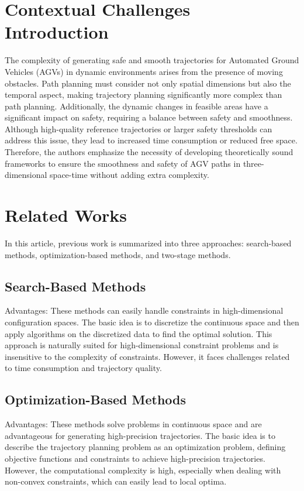 \section{Contextual Challenges Introduction}
The complexity of generating safe and smooth trajectories for Automated Ground Vehicles (AGVs) in dynamic environments arises from the presence of moving obstacles. Path planning must consider not only spatial dimensions but also the temporal aspect, making trajectory planning significantly more complex than path planning. Additionally, the dynamic changes in feasible areas have a significant impact on safety, requiring a balance between safety and smoothness. Although high-quality reference trajectories or larger safety thresholds can address this issue, they lead to increased time consumption or reduced free space. Therefore, the authors emphasize the necessity of developing theoretically sound frameworks to ensure the smoothness and safety of AGV paths in three-dimensional space-time without adding extra complexity.
\section{Related Works}
In this article, previous work is summarized into three approaches: search-based methods, optimization-based methods, and two-stage methods.
\subsection{Search-Based Methods}
Advantages: These methods can easily handle constraints in high-dimensional configuration spaces. The basic idea is to discretize the continuous space and then apply algorithms on the discretized data to find the optimal solution. This approach is naturally suited for high-dimensional constraint problems and is insensitive to the complexity of constraints. However, it faces challenges related to time consumption and trajectory quality.
\subsection{Optimization-Based Methods}
Advantages: These methods solve problems in continuous space and are advantageous for generating high-precision trajectories. The basic idea is to describe the trajectory planning problem as an optimization problem, defining objective functions and constraints to achieve high-precision trajectories. However, the computational complexity is high, especially when dealing with non-convex constraints, which can easily lead to local optima.
